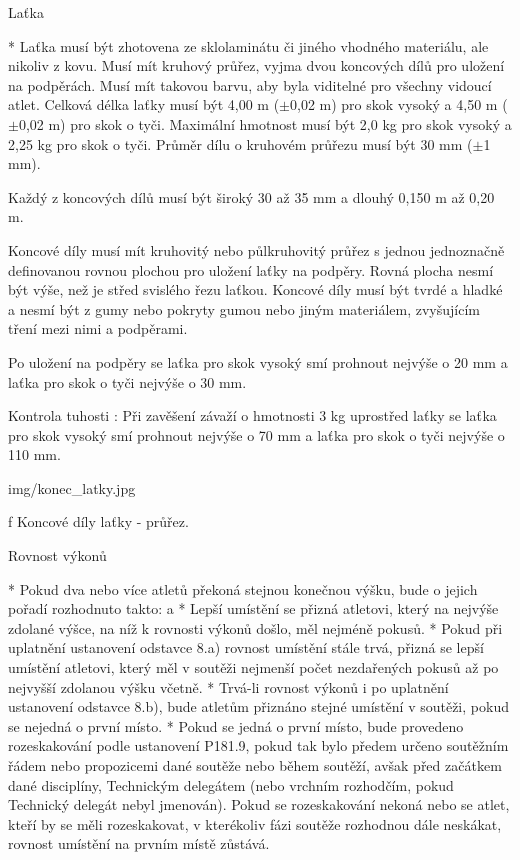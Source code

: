 Laťka

* Laťka musí být zhotovena ze sklolaminátu či jiného vhodného materiálu, ale nikoliv z kovu. Musí mít kruhový průřez, vyjma dvou koncových dílů pro uložení na podpěrách. Musí mít takovou barvu, aby byla viditelné pro všechny vidoucí atlet. Celková délka laťky musí být 4,00 m ($\pm$0,02 m) pro skok vysoký a 4,50 m ($\pm$0,02 m) pro skok o tyči. Maximální hmotnost musí být 2,0 kg pro skok vysoký a 2,25 kg pro skok o tyči. Průměr dílu o kruhovém průřezu musí být 30 mm ($\pm$1 mm).

Každý z koncových dílů musí být široký 30 až 35 mm a dlouhý 0,150 m až 0,20 m.

Koncové díly musí mít kruhovitý nebo půlkruhovitý průřez s jednou jednoznačně definovanou rovnou plochou pro uložení laťky na podpěry. Rovná plocha nesmí být výše, než je střed svislého řezu laťkou. Koncové díly musí být tvrdé a hladké a nesmí být z gumy nebo pokryty gumou nebo jiným materiálem, zvyšujícím tření mezi nimi a podpěrami.

Po uložení na podpěry se laťka pro skok vysoký smí prohnout nejvýše o 20 mm a laťka pro skok o tyči nejvýše o 30 mm.

Kontrola tuhosti : Při zavěšení závaží o hmotnosti 3 kg uprostřed laťky se laťka pro skok vysoký smí prohnout nejvýše o 70 mm a laťka pro  skok o tyči nejvýše o 110 mm.

\picw=6cm \inspic img/konec_latky.jpg
\caption/f Koncové díly laťky - průřez.

Rovnost výkonů

* Pokud dva nebo více atletů překoná stejnou konečnou výšku, bude o jejich pořadí rozhodnuto takto:
  \begitems \style a
  * Lepší umístění se přizná atletovi, který na nejvýše zdolané výšce, na níž k rovnosti výkonů došlo, měl nejméně pokusů.
  * Pokud při uplatnění ustanovení odstavce 8.a) rovnost umístění stále trvá, přizná se lepší umístění atletovi, který měl v soutěži nejmenší počet nezdařených pokusů až po nejvyšší zdolanou výšku včetně.
  * Trvá-li rovnost výkonů i po uplatnění ustanovení odstavce 8.b), bude atletům přiznáno stejné umístění v soutěži, pokud se nejedná o první místo.
  * Pokud se jedná o první místo, bude provedeno rozeskakování podle ustanovení P181.9, pokud tak bylo předem určeno soutěžním řádem nebo propozicemi dané soutěže nebo během soutěží, avšak před začátkem dané disciplíny, Technickým delegátem (nebo vrchním rozhodčím, pokud Technický delegát nebyl jmenován). Pokud se rozeskakování nekoná nebo se atlet, kteří by se měli rozeskakovat, v kterékoliv fázi soutěže rozhodnou dále neskákat, rovnost umístění na prvním místě zůstává.
  \enditems


